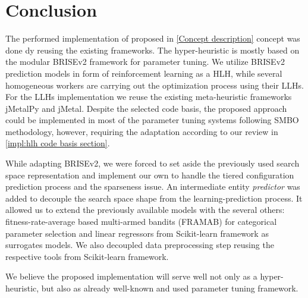 \section{Conclusion}
The performed implementation of proposed in \cref{Concept description} concept was done dy reusing the existing frameworks. The hyper-heuristic is mostly based on the modular BRISEv2 framework for parameter tuning. We utilize BRISEv2 prediction models in form of reinforcement learning as a HLH, while several homogeneous workers are carrying out the optimization process using their LLHs. For the LLHs implementation we reuse the existing meta-heuristic frameworks jMetalPy and jMetal. Despite the selected code basis, the proposed approach could be implemented in most of the parameter tuning systems following SMBO methodology, however, requiring the adaptation according to our review in \cref{impl:hlh code basis section}.

While adapting BRISEv2, we were forced to set aside the previously used search space representation and implement our own to handle the tiered configuration prediction process and the sparseness issue. An intermediate entity \emph{predictor} was added to decouple the search space shape from the learning-prediction process. It allowed us to extend the previously available models with the several others: fitness-rate-average based multi-armed bandits (FRAMAB) for categorical parameter selection and linear regressors from Scikit-learn framework as surrogates models. We also decoupled data preprocessing step reusing the respective tools from Scikit-learn framework.

We believe the proposed implementation will serve well not only as a hyper-heuristic, but also as already well-known and used parameter tuning framework.